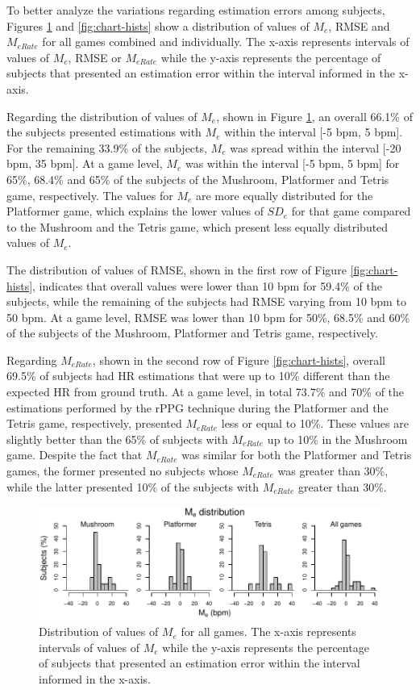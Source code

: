 To better analyze the variations regarding estimation errors among subjects, Figures \ref{fig:chart-hists-me} and \ref{fig:chart-hists} show a distribution of values of $M_e$, RMSE and $M_{eRate}$ for all games combined and individually. The x-axis represents intervals of values of $M_e$, RMSE or $M_{eRate}$ while the y-axis represents the percentage of subjects that presented an estimation error within the interval informed in the x-axis.

Regarding the distribution of values of $M_e$, shown in Figure \ref{fig:chart-hists-me}, an overall 66.1\% of the subjects presented estimations with $M_e$ within the interval [-5 bpm, 5 bpm]. For the remaining 33.9\% of the subjects, $M_e$ was spread within the interval [-20 bpm, 35 bpm]. At a game level, $M_e$ was within the interval [-5 bpm, 5 bpm] for 65\%, 68.4\% and 65\% of the subjects of the Mushroom, Platformer and Tetris game, respectively. The values for $M_e$ are more equally distributed for the Platformer game, which explains the lower values of $SD_e$ for that game compared to the Mushroom and the Tetris game, which present less equally distributed values of $M_e$.

The distribution of values of RMSE, shown in the first row of Figure \ref{fig:chart-hists}, indicates that overall values were lower than 10 bpm for 59.4\% of the subjects, while the remaining of the subjects had RMSE varying from 10 bpm to 50 bpm. At a game level, RMSE was lower than 10 bpm for 50\%, 68.5\% and 60\% of the subjects of the Mushroom, Platformer and Tetris game, respectively.

Regarding $M_{eRate}$, shown in the second row of Figure \ref{fig:chart-hists}, overall 69.5\% of subjects had HR estimations that were up to 10\% different than the expected HR from ground truth. At a game level, in total 73.7\% and 70\% of the estimations performed by the rPPG technique during the Platformer and the Tetris game, respectively, presented $M_{eRate}$ less or equal to 10\%. These values are slightly better than the 65\% of subjects with $M_{eRate}$ up to 10\% in the Mushroom game. Despite the fact that $M_{eRate}$ was similar for both the Platformer and Tetris games, the former presented no subjects whose $M_{eRate}$ was greater than 30\%, while the latter presented 10\% of the subjects with $M_{eRate}$ greater than 30\%.

\begin{figure}[!h]
\centering
\includegraphics[width=1.0\textwidth]{Content/figures/hist-me.pdf}
\caption{Distribution of values of $M_e$ for all games. The x-axis represents intervals of values of $M_e$ while the y-axis represents the percentage of subjects that presented an estimation error within the interval informed in the x-axis.}
\label{fig:chart-hists-me}
\end{figure}


